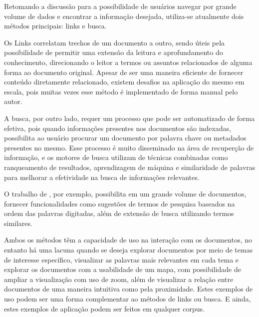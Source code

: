 \documentclass[12pt,a4paper]{article}
\begin{document}
 
 Retomando a discussão para a possibilidade de usuários navegar por grande volume de dados e encontrar a informação desejada, utiliza-se atualmente dois métodos principais:
 links e busca. 
 
 Os Links correlatam trechos de um documento a outro, sendo úteis pela possibilidade de permitir uma extensão da leitura e aprofundamento do conhecimento,
 direcionando o leitor a termos ou assuntos relacionados de alguma forma ao documento original. Apesar de ser uma maneira eficiente de fornecer conteúdo diretamente relacionado,
 existem desafios na aplicação do mesmo em escala, pois muitas vezes esse método é implementado de forma manual pelo autor. 
 
 A busca, por outro lado,
 requer um processo que pode ser automatizado de forma efetiva, pois quando informações presentes nos documentos são indexadas, possibilita ao usuário procurar um documento por palavra chave ou metadados presentes no mesmo.
 Esse processo é muito disseminado na área de recuperção de informação, e os motores de busca utilizam de técnicas combinadas como ranqueamento de resultados, aprendizagem de máquina e similaridade de palavras para melhorar a efetividade na busca de informações relevantes.

 O trabalho de , por exemplo, possibilita em um grande volume de documentos, fornecer funcionalidades como sugestões de termos de pesquisa baseados na ordem das palavras digitadas, além de extensão de busca utilizando termos similares.

Ambos os métodos têm a capacidade de uso na interação com os documentos, no entanto há uma lacuna quando se deseja explorar documentos por meio de temas de interesse específico,
 visualizar as palavras mais relevantes em cada tema e explorar os documentos com a usabilidade de um mapa, com possibilidade de ampliar a visualização com uso de zoom, além de visualizar a relação entre documentos de uma maneira intuitiva como pela proximidade. Estes exemplos de uso podem ser uma forma complementar ao métodos de links ou busca. E ainda, estes exemplos de aplicação podem ser feitos em qualquer corpus.
 
\end{document}
